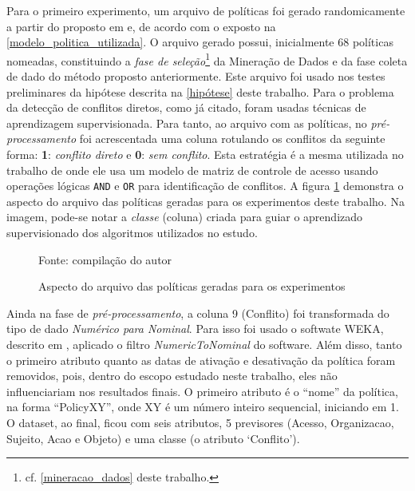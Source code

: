 Para o primeiro experimento, um arquivo de políticas foi gerado randomicamente a partir do proposto em  e, de acordo com o exposto na \autoref{modelo_politica_utilizada}. O arquivo gerado possui, inicialmente 68 políticas nomeadas, constituindo a \textit{fase de seleção}\footnote{cf. \autoref{mineracao_dados} deste trabalho.} da Mineração de Dados e da fase coleta de dado do método proposto anteriormente. Este arquivo foi usado nos testes preliminares da hipótese descrita na \autoref{hipótese} deste trabalho. Para o problema da detecção de conflitos diretos, como já citado, foram usadas técnicas de aprendizagem supervisionada. Para tanto, ao arquivo com as políticas, no \textit{pré-processamento }foi acrescentada uma coluna rotulando os conflitos da seguinte forma: \textbf{1}: \textit{conflito direto} e \textbf{0}: \textit{sem conflito}. Esta estratégia é a mesma utilizada no trabalho de  onde ele usa um modelo de matriz de controle de acesso usando operações lógicas \texttt{AND} e \texttt{OR} para identificação de conflitos. A figura \ref{fig:aspecto_arquivo} demonstra o aspecto do arquivo das políticas geradas para os experimentos deste trabalho. Na imagem, pode-se notar a \textit{classe} (coluna) criada para guiar o aprendizado supervisionado dos algoritmos utilizados no estudo.

\begin{figure}[h!]
	\centering
	\caption{Aspecto do arquivo das políticas geradas para os experimentos} %
	
	\label{fig:aspecto_arquivo}
	{\scriptsize Fonte: compilação do autor}
\end{figure}

Ainda na fase de \textit{pré-processamento}, a coluna 9 (Conflito) foi transformada do tipo de dado \textit{Numérico para Nominal}. Para isso foi usado o softwate WEKA, descrito em , aplicado o filtro \textit{NumericToNominal} do software. Além disso, tanto o primeiro atributo quanto as datas de ativação e desativação da política foram removidos, pois, dentro do escopo estudado neste trabalho, eles não influenciariam nos resultados finais. O primeiro atributo é o ``nome'' da política, na forma ``PolicyXY'', onde XY é um número inteiro sequencial, iniciando em 1. O dataset, ao final, ficou com seis atributos, 5 previsores (Acesso, Organizacao, Sujeito, Acao e Objeto) e uma classe (o atributo `Conflito').

